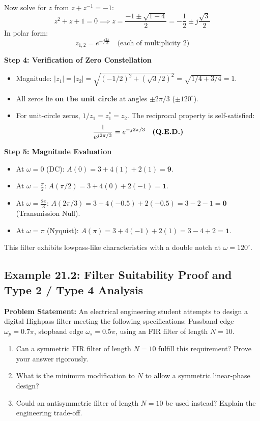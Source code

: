 \documentclass[11pt,a4paper]{article}
\begin{document}
Now solve for $z$ from $z + z^{-1} = -1$:
\begin{equation}
z^2 + z + 1 = 0 \implies z = \frac{-1 \pm \sqrt{1 - 4}}{2} = -\frac{1}{2} \pm j \frac{\sqrt{3}}{2}
\end{equation}
In polar form:
\begin{equation}
z_{1,2} = e^{\pm j \frac{2\pi}{3}} \quad \text{(each of multiplicity 2)}
\end{equation}

\vspace{1mm}
\noindent\textbf{Step 4: Verification of Zero Constellation}
\begin{itemize}
    \item Magnitude: $|z_1| = |z_2| = \sqrt{(-1/2)^2 + (\sqrt{3}/2)^2} = \sqrt{1/4 + 3/4} = 1$.
    \item All zeros lie \textbf{on the unit circle} at angles $\pm 2\pi/3$ ($\pm 120^\circ$).
    \item For unit-circle zeros, $1/z_1 = z_1^* = z_2$. The reciprocal property is self-satisfied:
    \begin{equation}
    \frac{1}{e^{j 2\pi/3}} = e^{-j 2\pi/3} \quad \text{\textbf{(Q.E.D.)}}
    \end{equation}
\end{itemize}

\vspace{1mm}
\noindent\textbf{Step 5: Magnitude Evaluation}
\begin{itemize}
    \item At $\omega = 0$ (DC): $A(0) = 3 + 4(1) + 2(1) = \mathbf{9}$.
    \item At $\omega = \frac{\pi}{2}$: $A(\pi/2) = 3 + 4(0) + 2(-1) = \mathbf{1}$.
    \item At $\omega = \frac{2\pi}{3}$: $A(2\pi/3) = 3 + 4(-0.5) + 2(-0.5) = 3 - 2 - 1 = \mathbf{0}$ (Transmission Null).
    \item At $\omega = \pi$ (Nyquist): $A(\pi) = 3 + 4(-1) + 2(1) = 3 - 4 + 2 = \mathbf{1}$.
\end{itemize}
This filter exhibits lowpass-like characteristics with a double notch at $\omega = 120^\circ$.

\subsection{Example 21.2: Filter Suitability Proof and Type 2 / Type 4 Analysis}
\textbf{Problem Statement:} An electrical engineering student attempts to design a digital Highpass filter meeting the following specifications: Passband edge $\omega_p = 0.7\pi$, stopband edge $\omega_s = 0.5\pi$, using an FIR filter of length $N = 10$.
\begin{enumerate}
    \item Can a symmetric FIR filter of length $N = 10$ fulfill this requirement? Prove your answer rigorously.
    \item What is the minimum modification to $N$ to allow a symmetric linear-phase design?
    \item Could an antisymmetric filter of length $N = 10$ be used instead? Explain the engineering trade-off.
\end{enumerate}
\end{document}
